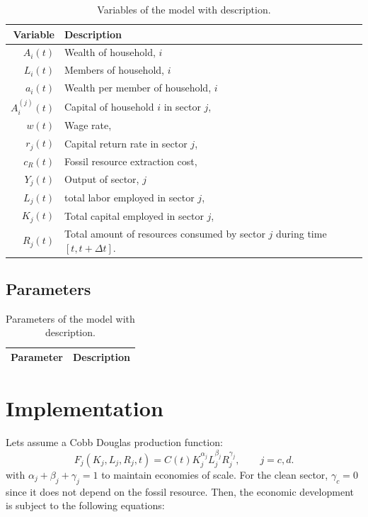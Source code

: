 \begin{table}[H]
	\centering
	\begin{tabular}{r|l}
		Variable & Description \\\hline
		$A_i(t)$ & Wealth of household, $i$ \\
		$L_i(t)$ & Members of household, $i$ \\
		$a_i(t)$ & Wealth per member of household, $i$ \\
		$A_i^{(j)} (t)$ & Capital of household $i$ in sector $j$, \\
		$w(t)$   & Wage rate, \\
		$r_j(t)$ & Capital return rate in sector $j$, \\
		$c_R(t)$ & Fossil resource extraction cost, \\
		$Y_j(t)$ & Output of sector, $j$ \\
		$L_j(t)$ & total labor employed in sector $j$, \\
		$K_j(t)$ & Total capital employed in sector $j$, \\
		$R_j(t)$ & Total amount of resources consumed by sector $j$ during time $[t, t + \Delta t]$. \\
	\end{tabular}
	\caption{Variables of the model with description.}
	\label{tab:variables}
\end{table}

\subsection{Parameters}

\begin{table}[H]
	\centering
	\begin{tabular}{r|l}
		Parameter & Description \\\hline
		
	\end{tabular}
	\caption{Parameters of the model with description.}
	\label{tab:parameters}
\end{table}


\section{Implementation}

Lets assume a Cobb Douglas production function:
\begin{equation}
	F_j(K_j,L_j,R_j,t) = C(t)K_j^{\alpha_j}L_j^{\beta_j}R_j^{\gamma_j}, \qquad j = c,d.
	\label{cobb_douglas}
\end{equation}
with $\alpha_j + \beta_j + \gamma_j = 1$ to maintain economies of scale. For the clean sector, $\gamma_c = 0$ since it does not depend on the fossil resource.
Then, the economic development is subject to the following equations:\\

